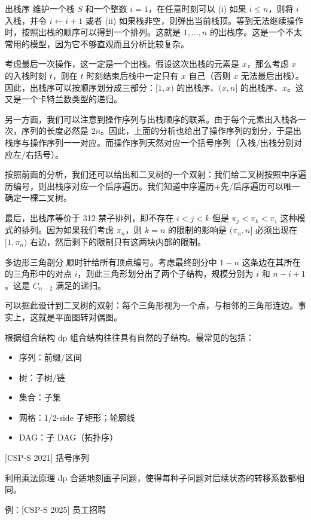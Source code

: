 \begin{frame}{出栈序}
    维护一个栈 $S$ 和一个整数 $i=1$，在任意时刻可以 (i) 如果 $i\le n$，则将 $i$ 入栈，并令 $i\gets i+1$ 或者 (ii) 如果栈非空，则弹出当前栈顶。等到无法继续操作时，按照出栈的顺序可以得到一个排列。这就是 $1,\ldots,n$ 的出栈序。这是一个不太常用的模型，因为它不够直观而且分析比较复杂。
    
    考虑最后一次操作，这一定是一个出栈。假设这次出栈的元素是 $x$，那么考虑 $x$ 的入栈时刻 $t$，则在 $t$ 时刻结束后栈中一定只有 $x$ 自己（否则 $x$ 无法最后出栈）。因此，出栈序可以按顺序划分成三部分：$[1,x)$ 的出栈序、$(x,n]$ 的出栈序、$x$。这又是一个卡特兰数类型的递归。

    另一方面，我们可以注意到操作序列与出栈顺序的联系。由于每个元素出入栈各一次，序列的长度必然是 $2n$。因此，上面的分析也给出了操作序列的划分，于是出栈序与操作序列一一对应。而操作序列天然对应一个括号序列（入栈/出栈分别对应左/右括号）。
\end{frame}
\begin{frame}
    按照前面的分析，我们还可以给出和二叉树的一个双射：我们给二叉树按照中序遍历编号，则出栈序对应一个后序遍历。我们知道中序遍历+先/后序遍历可以唯一确定一棵二叉树。

    最后，出栈序等价于 312 禁子排列，即不存在 $i<j<k$ 但是 $\pi_j<\pi_k<\pi_i$ 这种模式的排列。因为如果我们考虑 $\pi_n$，则 $k=n$ 的限制的影响是 $(\pi_n,n]$ 必须出现在 $[1,\pi_n)$ 右边，然后剩下的限制只有这两块内部的限制。
\end{frame}
\begin{frame}{多边形三角剖分}
    顺时针给所有顶点编号。考虑最终剖分中 $1-n$ 这条边在其所在的三角形中的对点 $i$，则此三角形划分出了两个子结构，规模分别为 $i$ 和 $n-i+1$。这是 $C_{n-2}$ 满足的递归。

    可以据此设计到二叉树的双射：每个三角形视为一个点，与相邻的三角形连边。事实上，这就是平面图转对偶图。
\end{frame}
\begin{frame}{根据组合结构 dp}
    组合结构往往具有自然的子结构。最常见的包括：

    \begin{itemize}
        \item 序列：前缀/区间
        \item 树：子树/链
        \item 集合：子集
        \item 网格：1/2-side 子矩形；轮廓线
        \item DAG：子 DAG（拓扑序）
    \end{itemize}
\end{frame}
\begin{frame}{[CSP-S 2021] 括号序列}
\end{frame}
\begin{frame}{利用乘法原理 dp}
    合适地刻画子问题，使得每种子问题对后续状态的转移系数都相同。

    例：[CSP-S 2025] 员工招聘
\end{frame}

